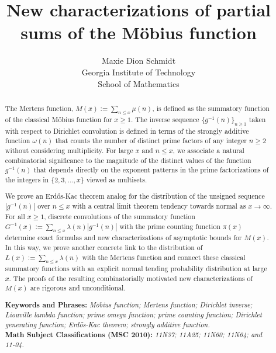 \documentclass[11pt,reqno,a4letter]{article}
\title{
       \LARGE{
       New characterizations of partial sums of the M\"obius function 
       } 
}
\author{{\Large Maxie Dion Schmidt} \\ 
        {\normalsize Georgia Institute of Technology} \\[0.025cm] 
        {\normalsize School of Mathematics} 
}
\numberwithin{figure}{section}
\numberwithin{table}{section}
\theoremstyle{plain}
\numberwithin{theorem}{section}
\theoremstyle{definition}
\begin{document}
 

\maketitle

\begin{abstract} 
The Mertens function, $M(x) := \sum_{n \leq x} \mu(n)$, is 
defined as the summatory function of the classical M\"obius function for $x \geq 1$. 
The inverse sequence $\{g^{-1}(n)\}_{n \geq 1}$ 
taken with respect to Dirichlet convolution is defined in terms of the 
strongly additive function $\omega(n)$ that counts the 
number of distinct prime factors of any integer $n \geq 2$ without considering multiplicity. 
For large $x$ and $n \leq x$, we associate a natural combinatorial 
significance to the magnitude of the distinct values of the 
function $g^{-1}(n)$ that depends directly on the exponent patterns in the 
prime factorizations of the integers in $\{2,3,\ldots,x\}$ viewed as multisets. 

We prove an Erd\H{o}s-Kac theorem analog for the distribution of the 
unsigned sequence $|g^{-1}(n)|$ over $n \leq x$ with a central limit theorem 
tendency towards normal as $x \rightarrow \infty$. 
For all $x \geq 1$, discrete convolutions of the summatory function 
$G^{-1}(x) := \sum_{n \leq x} \lambda(n) |g^{-1}(n)|$ with 
the prime counting function $\pi(x)$ determine 
exact formulas and new characterizations of asymptotic bounds for $M(x)$. 
In this way, we prove another concrete link to the distribution of  
$L(x) := \sum_{n \leq x} \lambda(n)$ with the Mertens function and connect these classical 
summatory functions with an explicit normal tending 
probability distribution at large $x$. 
The proofs of the resulting combinatorially motivated new characterizations of $M(x)$ 
are rigorous and unconditional. 

\bigskip 
\noindent
\textbf{Keywords and Phrases:} {\it M\"obius function; Mertens function; 
                                    Dirichlet inverse; Liouville lambda function; prime omega function; 
                                    prime counting function; Dirichlet generating function; 
                                    Erd\H{o}s-Kac theorem; strongly additive function. } \\ 
\textbf{Math Subject Classifications (MSC 2010):} {\it 11N37; 11A25; 11N60; 11N64; and 11-04. } 
\end{abstract} 
\end{document}
